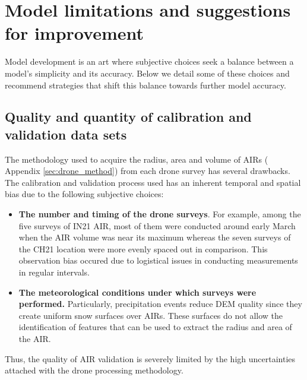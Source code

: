 
\section{Model limitations and suggestions for improvement}


Model development is an art where subjective choices seek a balance between a model's simplicity and its accuracy.
Below we detail some of these choices and recommend strategies that shift this balance towards further model
accuracy.

\subsection{Quality and quantity of calibration and validation data sets}

The methodology used to acquire the radius, area and volume of \ac{AIRs} ( Appendix \ref{sec:drone_method}) from
each drone survey has several drawbacks. The calibration and validation process used has an inherent temporal
and spatial bias due to the following subjective choices:

\begin{itemize}
	\item \textbf{The number and timing of the drone surveys}. For example, among the five surveys of IN21 AIR, most of them were
	      conducted around early March when the AIR volume was near its maximum whereas the seven surveys of the CH21
	      location were more evenly spaced out in comparison. This observation bias occured due to logistical issues
	      in conducting measurements in regular intervals.

	\item \textbf{The meteorological conditions under which surveys were performed.} Particularly, precipitation events reduce DEM quality since
	      they create uniform snow surfaces over \ac{AIRs}. These surfaces do not allow the identification of features
	      that can be used to extract the radius and area of the AIR.

\end{itemize}

Thus, the quality of AIR validation is severely limited by the high uncertainties attached with the drone
processing methodology.

